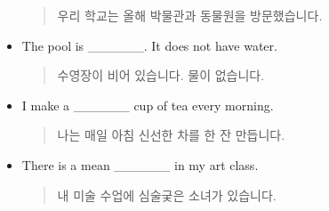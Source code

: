 \documentclass{article}
\begin{document}
\begin{addmargin}[1em]{1em}
\begin{itemize}
\begin{quote}
    우리 학교는 올해 박물관과 동물원을 방문했습니다.
    \end{quote}
    \item The pool is \_\_\_\_\_\_. It does not have water.
    \begin{quote}
    수영장이 비어 있습니다. 물이 없습니다.
    \end{quote}
    \item I make a \_\_\_\_\_\_ cup of tea every morning.
    \begin{quote}
    나는 매일 아침 신선한 차를 한 잔 만듭니다.
    \end{quote}
    \item There is a mean \_\_\_\_\_\_ in my art class.
    \begin{quote}
    내 미술 수업에 심술궂은 소녀가 있습니다.
    \end{quote}
\end{itemize}
\end{addmargin}
\end{document}
